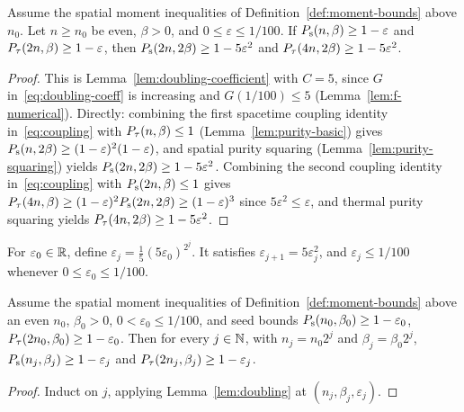 \begin{lemma}
  \label{lem:doubling}
  \leanok
  Assume the spatial moment inequalities of Definition~\ref{def:moment-bounds} above \(n_0\). Let
  \(n \ge n_0\) be even, \(\beta > 0\), and \(0 \le \varepsilon \le 1/100\). If
  \(P_{\mathrm{s}}(n, \beta) \ge 1 - \varepsilon\) and \(P_{\tau}(2n, \beta) \ge 1 - \varepsilon\), then
  \(P_{\mathrm{s}}(2n, 2\beta) \ge 1 - 5\varepsilon^2\) and \(P_{\tau}(4n, 2\beta) \ge 1 - 5\varepsilon^2\).
\end{lemma}
\begin{proof}
  \leanok
  This is Lemma~\ref{lem:doubling-coefficient} with \(C = 5\), since \(G\) in~\eqref{eq:doubling-coeff}
  is increasing and \(G(1/100) \le 5\) (Lemma~\ref{lem:f-numerical}). Directly: combining the first
  spacetime coupling identity in~\eqref{eq:coupling} with \(P_{\tau}(n, \beta) \le 1\)
  (Lemma~\ref{lem:purity-basic}) gives \(P_{\mathrm{s}}(n, 2\beta) \ge (1-\varepsilon)^2 (1-\varepsilon)\), and
  spatial purity squaring (Lemma~\ref{lem:purity-squaring}) yields
  \(P_{\mathrm{s}}(2n, 2\beta) \ge 1 - 5\varepsilon^2\). Combining the second coupling identity
  in~\eqref{eq:coupling} with \(P_{\mathrm{s}}(2n, \beta) \le 1\) gives
  \(P_{\tau}(4n, \beta) \ge (1-\varepsilon)^2 P_{\mathrm{s}}(2n, 2\beta) \ge (1-\varepsilon)^3\) since
  \(5\varepsilon^2 \le \varepsilon\), and thermal purity squaring yields
  \(P_{\tau}(4n, 2\beta) \ge 1 - 5\varepsilon^2\).
\end{proof}

\begin{definition}
  \label{def:defect}
  \leanok
  For \(\varepsilon_0 \in \mathbb{R}\), define \(\varepsilon_j = \tfrac15 (5\varepsilon_0)^{2^j}\). It
  satisfies \(\varepsilon_{j+1} = 5\varepsilon_j^2\), and \(\varepsilon_j \le 1/100\) whenever
  \(0 \le \varepsilon_0 \le 1/100\).
\end{definition}

\begin{lemma}
  \label{lem:induction-on-scale}
  \leanok
  Assume the spatial moment inequalities of Definition~\ref{def:moment-bounds} above an even
  \(n_0\), \(\beta_0 > 0\), \(0 < \varepsilon_0 \le 1/100\), and seed bounds
  \(P_{\mathrm{s}}(n_0, \beta_0) \ge 1 - \varepsilon_0\), \(P_{\tau}(2n_0, \beta_0) \ge 1 - \varepsilon_0\). Then
  for every \(j \in \mathbb{N}\), with \(n_j = n_0 2^j\) and \(\beta_j = \beta_0 2^j\),
  \(P_{\mathrm{s}}(n_j, \beta_j) \ge 1 - \varepsilon_j\) and \(P_{\tau}(2n_j, \beta_j) \ge 1 - \varepsilon_j\).
\end{lemma}
\begin{proof}
  \leanok
  Induct on \(j\), applying Lemma~\ref{lem:doubling} at \((n_j, \beta_j, \varepsilon_j)\).
\end{proof}

